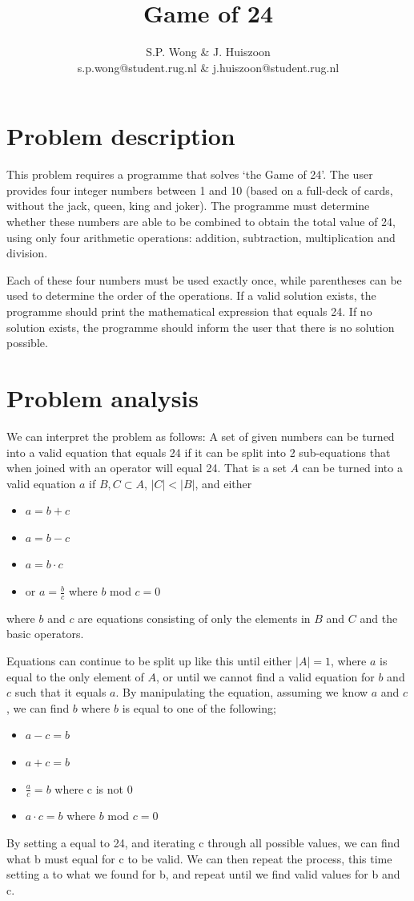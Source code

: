 \documentclass[a4paper,10pt]{article}
\title{Game of 24}
\author{S.P. Wong \& J. Huiszoon\\
        s.p.wong@student.rug.nl \& j.huiszoon@student.rug.nl}
\begin{document}
\maketitle

\section{Problem description}
This problem requires a programme that solves ‘the Game of 24’. The user provides four integer numbers between 1 and 10 (based on a full-deck of cards, without the jack, queen, king and joker). The programme must determine whether these numbers are able to be combined to obtain the total value of 24, using only four arithmetic operations: addition, subtraction, multiplication and division. 

Each of these four numbers must be used exactly once, while parentheses can be used to determine the order of the operations. If a valid solution exists, the programme should print the mathematical expression that equals 24. If no solution exists, the programme should inform the user that there is no solution possible.

\section{Problem analysis}
We can interpret the problem as follows: A set of given numbers can be turned into a valid equation that equals 24 if it can be split into 2 sub-equations that when joined with an operator will equal 24. That is a set $A$ can be turned into a valid equation $a$ if $B,C \subset A$, $|C| < |B|$, and either
\begin{itemize}
\item $a = b + c$
\item $a = b - c$
\item $a = b \cdot c$
\item or $a = \frac{b}{c}$ where $b$ mod $c = 0$
\end{itemize}
where $b$ and $c$ are equations consisting of only the elements in $B$ and $C$ and the basic operators.

Equations can continue to be split up like this until either $|A| = 1$, where $a$ is equal to the only element of $A$, or until we cannot find a valid equation for $b$ and $c$ such that it equals $a$.
By manipulating the equation, assuming we know $a$ and $c$, we can find $b$ where $b$ is equal to one of the following; 
\begin{itemize}
\item $a-c=b$ 
\item $a+c=b$ 
\item $\frac{a}{c}=b$ where c is not 0 
\item $a \cdot c=b$ where $b$ mod $c = 0$
\end{itemize}
By setting a equal to 24, and iterating c through all possible values, we can find what b must equal for c to be valid. We can then repeat the process, this time setting a to what we found for b, and repeat until we find valid values for b and c.
\end{document}
